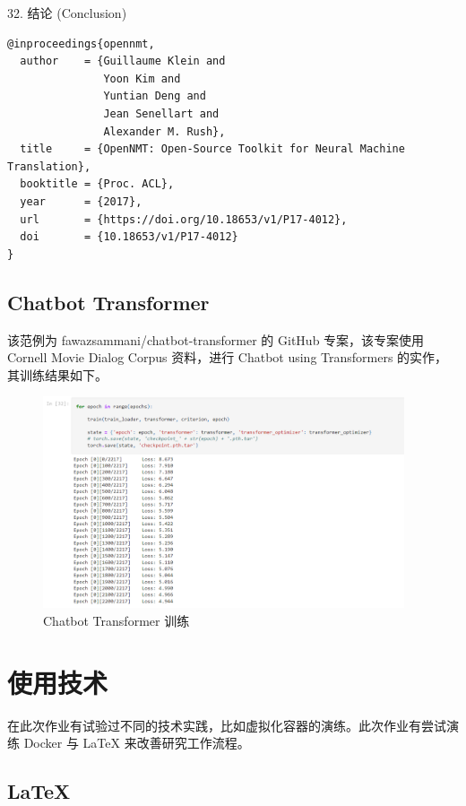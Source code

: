 32. 结论 (Conclusion)

\begin{Verbatim}
@inproceedings{opennmt,
  author    = {Guillaume Klein and
               Yoon Kim and
               Yuntian Deng and
               Jean Senellart and
               Alexander M. Rush},
  title     = {OpenNMT: Open-Source Toolkit for Neural Machine Translation},
  booktitle = {Proc. ACL},
  year      = {2017},
  url       = {https://doi.org/10.18653/v1/P17-4012},
  doi       = {10.18653/v1/P17-4012}
}
\end{Verbatim}

\subsection{Chatbot Transformer}

该范例为 fawazsammani/chatbot-transformer 的 GitHub 专案，该专案使用 Cornell Movie Dialog Corpus 资料，进行 Chatbot using Transformers 的实作，其训练结果如下。

\begin{figure}[htb]
\centering 
\includegraphics[width=0.95\textwidth]{img/n10.png} 
\caption{Chatbot Transformer 训练}
\label{Test}
\end{figure}

\section{使用技术}

在此次作业有试验过不同的技术实践，比如虚拟化容器的演练。此次作业有尝试演练 Docker 与 LaTeX 来改善研究工作流程。

\subsection{LaTeX}

